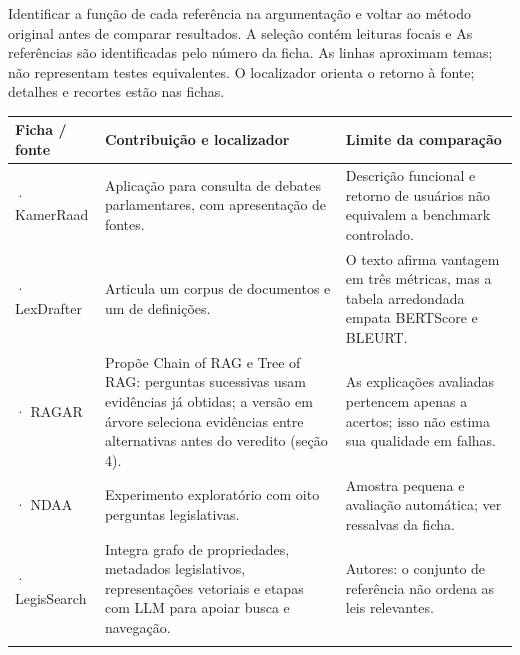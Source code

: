 Identificar a função de cada referência na argumentação e voltar ao método original antes de comparar resultados. A seleção contém leituras focais e
\clearpage
{}
As referências são identificadas pelo número da ficha. As linhas aproximam temas; não representam testes equivalentes. O localizador orienta o retorno à fonte; detalhes e recortes estão nas fichas.

{\small\renewcommand{\arraystretch}{1.3}
\begin{tabularx}{\textwidth}{@{}>{\raggedright\arraybackslash}p{29mm}>{\raggedright\arraybackslash}X>{\raggedright\arraybackslash}X@{}}
\toprule
\textbf{Ficha / fonte} & \textbf{Contribuição e localizador} & \textbf{Limite da comparação}\\
\midrule
02 · KamerRaad & Aplicação para consulta de debates parlamentares, com apresentação de fontes.\par\smallskip{\footnotesize Seções 2–3} & Descrição funcional e retorno de usuários não equivalem a benchmark controlado.\\
\addlinespace[5pt]
10 · LexDrafter & Articula um corpus de documentos e um de definições.\par\smallskip{\footnotesize seção 5.2, p. 10454} & O texto afirma vantagem em três métricas, mas a tabela arredondada empata BERTScore e BLEURT.\\
\addlinespace[5pt]
11 · RAGAR & Propõe Chain of RAG e Tree of RAG: perguntas sucessivas usam evidências já obtidas; a versão em árvore seleciona evidências entre alternativas antes do veredito (seção 4).\par\smallskip{\footnotesize Resumo, p. 280} & As explicações avaliadas pertencem apenas a acertos; isso não estima sua qualidade em falhas.\\
\addlinespace[5pt]
13 · NDAA & Experimento exploratório com oito perguntas legislativas.\par\smallskip{\footnotesize Seções 1–2} & Amostra pequena e avaliação automática; ver ressalvas da ficha.\\
\addlinespace[5pt]
15 · LegisSearch & Integra grafo de propriedades, metadados legislativos, representações vetoriais e etapas com LLM para apoiar busca e navegação.\par\smallskip{\footnotesize Discussão das limitações} & Autores: o conjunto de referência não ordena as leis relevantes.\\
\addlinespace[5pt]
\bottomrule
\end{tabularx}}


